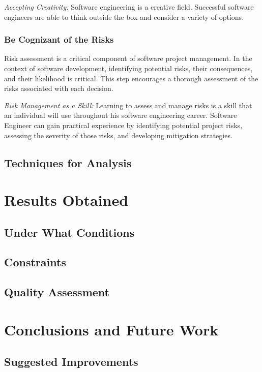 \documentclass[a4paper,12pt]{report}
\begin{document}
\textit{Accepting Creativity:} Software engineering is a creative field. Successful software engineers are able to think outside the box and consider a variety of options.

\subsection{Be Cognizant of the Risks}
Risk assessment is a critical component of software project management. In the context of software development, identifying potential risks, their consequences, and their likelihood is critical. This step encourages a thorough assessment of the risks associated with each decision.

\textit{Risk Management as a Skill:} Learning to assess and manage risks is a skill that an individual will use throughout his software engineering career. Software Engineer can gain practical experience by identifying potential project risks, assessing the severity of those risks, and developing mitigation strategies.

\section{Techniques for Analysis}

\chapter{Results Obtained}
\section{Under What Conditions}
\section{Constraints}
\section{Quality Assessment}

\chapter{Conclusions and Future Work}
\section{Suggested Improvements}
\end{document}
